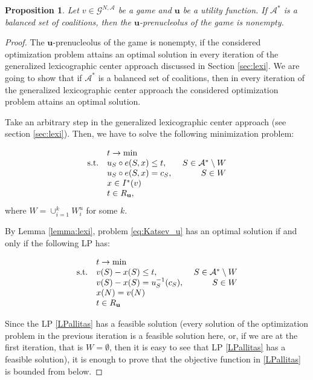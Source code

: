 \documentclass[a4paper,12pt]{article}
\newtheorem{proposition}[theorem]{Proposition}
\theoremstyle{definition}
\theoremstyle{remark}
\begin{document}
\begin{proposition}\label{th:Katsev2}
Let $v\in \mathcal{G}^{N, \mathcal{A}}$ be a game and $\mathbf{u}$ be a utility function. If $\mathcal{A}^*$ is a balanced set of coalitions, then the $\mathbf{u}$-prenucleolus of the game is nonempty.
\end{proposition}

\begin{proof}
The $\mathbf{u}$-prenucleolus of the game is nonempty, if the considered optimization problem attains an optimal solution in every iteration of the generalized lexicographic center approach discussed in Section \ref{sec:lexi}. We are going to show that if $\mathcal{A}^*$ is a balanced set of coalitions, then in every iteration of the generalized lexicographic center approach the considered optimization problem attains an optimal solution.

Take an arbitrary step in the generalized lexicographic center approach (see section \ref{sec:lexi}). Then, we have to solve the following minimization problem:

\begin{equation}\label{eq:Katsev_u}
\begin{array}{llr}
& t \to \min & \\
\textup{s.t.} & u_S \circ e(S, x) \leq t, & \ S \in \mathcal{A}^\ast \setminus W \\
& u_S \circ e(S, x) = c_S, & S\in W \\
& x\in I^*(v) &  \\
& t \in R_{\mathbf{u}}, & 
\end{array}
\end{equation}
where $W=\cup_{i=1}^k W^u_i$ for some $k$.

By Lemma \ref{lemma:lexi}, problem \eqref{eq:Katsev_u} has an optimal solution if and only if the following LP has:

\begin{equation}\label{LPallitas}
\begin{array}{llr}
& t \to \min & \\
\textup{s.t.} & v(S)-x(S) \leq t, & \ S \in \mathcal{A}^\ast \setminus W \\
& v(S) - x(S) = u_S^{-1}(c_S), & S\in W \\
& x(N) = v(N) &  \\
& t \in R_{\mathbf{u}} & 
\end{array}
\end{equation}

Since the LP \eqref{LPallitas} has a feasible solution (every solution of the optimization problem in the previous iteration is a feasible solution here, or, if we are at the first iteration, that is $W= \emptyset$, then it is easy to see that LP \eqref{LPallitas} has a feasible solution), it is enough to prove that the objective function in \eqref{LPallitas} is bounded from below. 


\end{proof}
\end{document}
